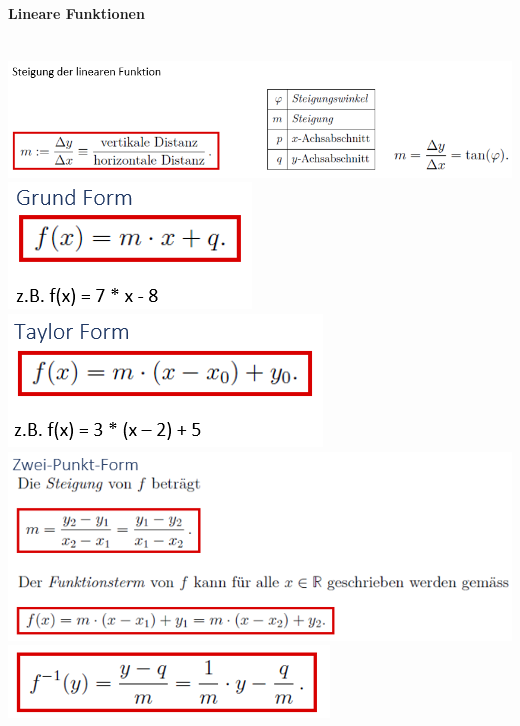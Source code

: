 \paragraph{Lineare Funktionen}\mbox{}\\
\noindent
\includegraphics[width=\columnwidth]{./images/lin.png}
\includegraphics[width=\columnwidth]{./images/lin1.png}
\includegraphics[width=\columnwidth]{./images/lin2.png}
\includegraphics[width=\columnwidth]{./images/lin3.png}
\includegraphics[width=\columnwidth]{./images/lin4.png}
\vspace{1mm}

